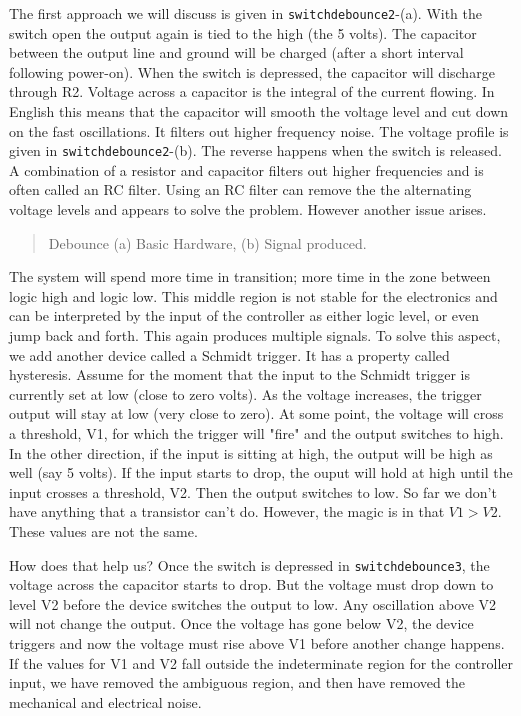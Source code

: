 The first approach we will discuss is given in
\texttt{switchdebounce2}-(a). With the switch open the output again is
tied to the high (the 5 volts). The capacitor between the output line
and ground will be charged (after a short interval following power-on).
When the switch is depressed, the capacitor will discharge through R2.
Voltage across a capacitor is the integral of the current flowing. In
English this means that the capacitor will smooth the voltage level and
cut down on the fast oscillations. It filters out higher frequency
noise. The voltage profile is given in \texttt{switchdebounce2}-(b). The
reverse happens when the switch is released. A combination of a resistor
and capacitor filters out higher frequencies and is often called an RC
filter. Using an RC filter can remove the the alternating voltage levels
and appears to solve the problem. However another issue arises.

\begin{quote}
Debounce (a) Basic Hardware, (b) Signal produced.
\end{quote}

The system will spend more time in transition; more time in the zone
between logic high and logic low. This middle region is not stable for
the electronics and can be interpreted by the input of the controller as
either logic level, or even jump back and forth. This again produces
multiple signals. To solve this aspect, we add another device called a
Schmidt trigger. It has a property called hysteresis. Assume for the
moment that the input to the Schmidt trigger is currently set at low
(close to zero volts). As the voltage increases, the trigger output will
stay at low (very close to zero). At some point, the voltage will cross
a threshold, V1, for which the trigger will "fire" and the output
switches to high. In the other direction, if the input is sitting at
high, the output will be high as well (say 5 volts). If the input starts
to drop, the ouput will hold at high until the input crosses a
threshold, V2. Then the output switches to low. So far we don't have
anything that a transistor can't do. However, the magic is in that
\(V1 > V2\). These values are not the same.

How does that help us? Once the switch is depressed in
\texttt{switchdebounce3}, the voltage across the capacitor starts to
drop. But the voltage must drop down to level V2 before the device
switches the output to low. Any oscillation above V2 will not change the
output. Once the voltage has gone below V2, the device triggers and now
the voltage must rise above V1 before another change happens. If the
values for V1 and V2 fall outside the indeterminate region for the
controller input, we have removed the ambiguous region, and then have
removed the mechanical and electrical noise.

